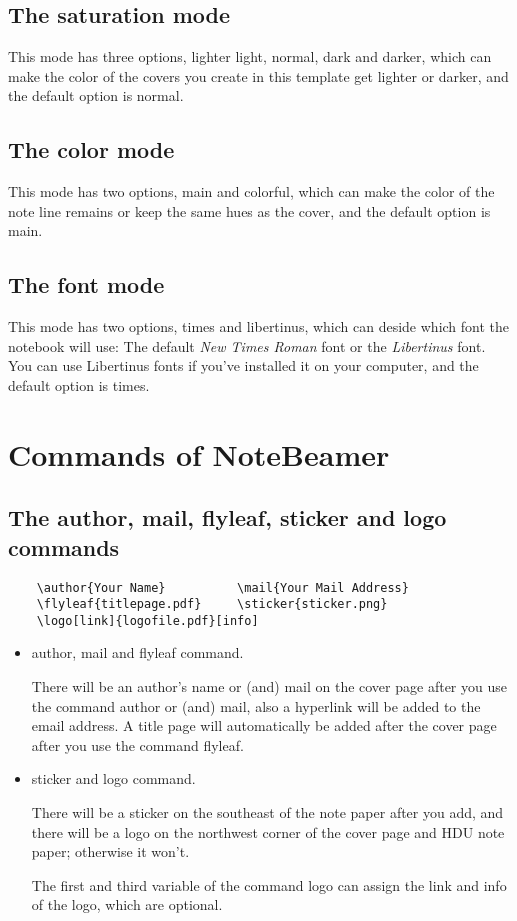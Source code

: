 \documentclass[11pt]{article}
\makeatletter
\def\@pkg#1{\texorpdfstring{\href{https://www.ctan.org/pkg/#1}{\textcolor{pkgcolor}{\textsf{#1}}}}{“#1”}}
\def\s@pkg#1{\texorpdfstring{\textcolor{pkgcolor}{\textsf{#1}}}{“#1”}}
\DeclareRobustCommand\pkg{\@ifstar\s@pkg\@pkg}
\def\mode#1{\texorpdfstring{\textcolor{moducolor}{\textsf{#1}}}{“#1”}}
\def\cmd#1{\texorpdfstring{\textcolor{cmdcolor}{\textsf{#1}}}{“#1”}}
\makeatother
\begin{document}
\subsection{The \mode{saturation} mode}
This mode has three options, \mode{lighter} \mode{light}, \mode{normal}, \mode{dark} and \mode{darker}, which can make the color of the covers you create in this template get lighter or darker, and the default option is \mode{normal}.

\subsection{The \mode{color} mode}
This mode has two options, \mode{main} and \mode{colorful}, which can make the color of the note line remains or keep the same hues as the cover, and the default option is \mode{main}.

\subsection{The \mode{font} mode}
This mode has two options, \mode{times} and \mode{libertinus}, which can deside which font the notebook will use: The default \emph{New Times Roman} font or the \emph{Libertinus} font. You can use Libertinus fonts if you've installed it on your computer, and the default option is \mode{times}.

\section{Commands of \pkg{NoteBeamer}}

\subsection{The \cmd{author}, \cmd{mail}, \cmd{flyleaf}, \cmd{sticker} and \cmd{logo} commands}
\begin{verbatim}
    \author{Your Name}          \mail{Your Mail Address}
    \flyleaf{titlepage.pdf}     \sticker{sticker.png}
    \logo[link]{logofile.pdf}[info]
\end{verbatim}
\begin{itemize}
    \item \cmd{author}, \cmd{mail} and \cmd{flyleaf} command.
    
    There will be an author's name or (and) mail on the cover page after you use the command \cmd{author} or (and) \cmd{mail}, also a hyperlink will be added to the email address. A title page will automatically be added after the cover page after you use the command \cmd{flyleaf}.

    \item  \cmd{sticker} and \cmd{logo} command.
    
    There will be a sticker on the southeast of the note paper after you add, and there will be a logo on the northwest corner of the cover page and HDU note paper; otherwise it won't.

    The first and third variable of the command \cmd{logo} can assign the link and info of the logo, which are optional.
\end{itemize}
\end{document}
